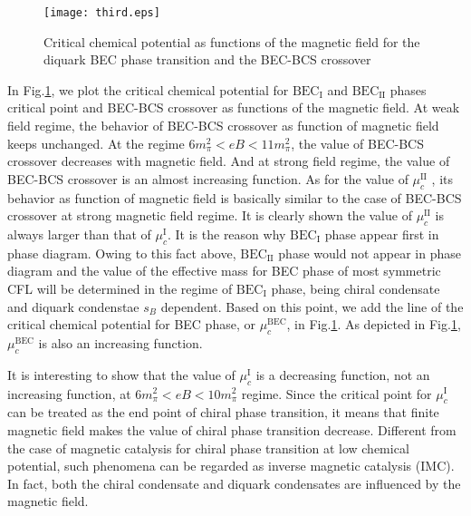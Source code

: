 \documentclass[prd, showpacs,nofootinbib,amsmath,amssymb]{revtex4}
\begin{document}

\begin{figure}[h]
  \caption{Critical  chemical potential  as  functions of the magnetic field for  the diquark BEC phase transition and the BEC-BCS crossover}
  \centering
    \texttt{[image: third.eps]}
    \label{fig:thirdpoint}
\end{figure}

In Fig.\ref{fig:thirdpoint}, we plot the critical  chemical potential for  $\text{BEC}_\text{I}$  and $\text{BEC}_\text{II}$  phases  critical point and BEC-BCS crossover as  functions of the magnetic field.
At weak field regime, the behavior of BEC-BCS crossover as function of magnetic field keeps unchanged.
At the regime $ 6 m_\pi^2 <eB < 11 m_\pi^2$, the value of BEC-BCS crossover  decreases with magnetic field.
And at  strong field regime, the value of BEC-BCS crossover is an almost increasing function.
As for the value of $\mu_c^\text{II}$ , its behavior as function of magnetic field is basically similar to the case of  BEC-BCS crossover at strong magnetic field regime.
It is clearly shown the value of $\mu_c^\text{II}$  is always larger than that of $\mu_c^\text{I}$.
It is the reason why $\text{BEC}_\text{I}$ phase appear first in phase diagram.
Owing to this fact above, $\text{BEC}_\text{II}$ phase would not appear  in phase diagram
and the value of the effective mass for BEC phase of most symmetric CFL will be determined in the regime of $\text{BEC}_\text{I}$ phase, being chiral condensate and diquark condenstae $s_B$ dependent.
Based on this point, we add the line of the critical  chemical potential for  BEC phase, or $\mu_c^\text{BEC}$, in Fig.\ref{fig:thirdpoint}.
As depicted in Fig.\ref{fig:thirdpoint}, $\mu_c^\text{BEC}$ is also an  increasing function.


It is interesting to show that the value of $\mu_c^\text{I}$ is a decreasing function, not an increasing function, at $ 6 m_\pi^2 <eB < 10 m_\pi^2$ regime.
Since the critical point for $\mu_c^\text{I}$ can be treated as  the end point of chiral phase transition,
it means that finite magnetic field makes the value of  chiral phase transition decrease.
Different from the case  of magnetic catalysis for chiral phase transition at low chemical potential, such
phenomena can be regarded as inverse magnetic catalysis (IMC).
In fact, both the chiral condensate and diquark condensates are influenced by the magnetic field.
\end{document}
